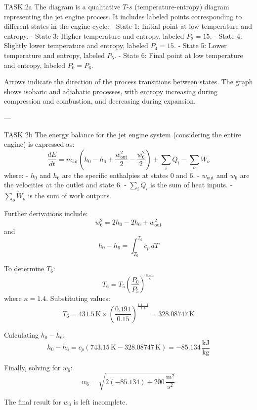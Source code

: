 TASK 2a  
The diagram is a qualitative \( T \)-\( s \) (temperature-entropy) diagram representing the jet engine process. It includes labeled points corresponding to different states in the engine cycle:  
- State 1: Initial point at low temperature and entropy.  
- State 3: Higher temperature and entropy, labeled \( P_2 = 15 \).  
- State 4: Slightly lower temperature and entropy, labeled \( P_4 = 15 \).  
- State 5: Lower temperature and entropy, labeled \( P_5 \).  
- State 6: Final point at low temperature and entropy, labeled \( P_0 = P_6 \).  

Arrows indicate the direction of the process transitions between states. The graph shows isobaric and adiabatic processes, with entropy increasing during compression and combustion, and decreasing during expansion.  

---

TASK 2b  
The energy balance for the jet engine system (considering the entire engine) is expressed as:  
\[
\frac{dE}{dt} = \dot{m}_{\text{air}} \left( h_0 - h_6 + \frac{w_{\text{out}}^2}{2} - \frac{w_6^2}{2} \right) + \sum_i \dot{Q}_i - \sum_o \dot{W}_o
\]  
where:  
- \( h_0 \) and \( h_6 \) are the specific enthalpies at states 0 and 6.  
- \( w_{\text{out}} \) and \( w_6 \) are the velocities at the outlet and state 6.  
- \( \sum_i \dot{Q}_i \) is the sum of heat inputs.  
- \( \sum_o \dot{W}_o \) is the sum of work outputs.  

Further derivations include:  
\[
w_6^2 = 2 h_0 - 2 h_6 + w_{\text{out}}^2
\]  
and  
\[
h_0 - h_6 = \int_{T_0}^{T_6} c_p \, dT
\]  

To determine \( T_6 \):  
\[
T_6 = T_5 \left( \frac{P_0}{P_5} \right)^{\frac{\kappa - 1}{\kappa}}
\]  
where \( \kappa = 1.4 \). Substituting values:  
\[
T_6 = 431.5 \, \text{K} \times \left( \frac{0.191}{0.15} \right)^{\frac{1.4 - 1}{1.4}} = 328.08747 \, \text{K}
\]  

Calculating \( h_0 - h_6 \):  
\[
h_0 - h_6 = c_p (743.15 \, \text{K} - 328.08747 \, \text{K}) = -85.134 \, \frac{\text{kJ}}{\text{kg}}
\]  

Finally, solving for \( w_6 \):  
\[
w_6 = \sqrt{2 (-85.134) + 200 \, \frac{\text{m}^2}{\text{s}^2}}
\]  

The final result for \( w_6 \) is left incomplete.
